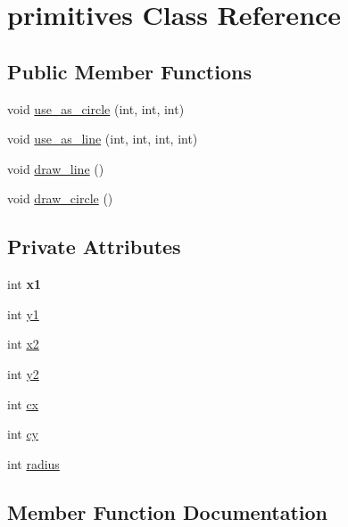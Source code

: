 \hypertarget{classprimitives}{}\section{primitives Class Reference}
\label{classprimitives}
\subsection*{Public Member Functions}
\begin{DoxyCompactItemize}
\item 
void \mbox{\hyperlink{classprimitives_a564d6b5f62f0958ed7773fdddd8ae05c}{use\+\_\+as\+\_\+circle}} (int, int, int)
\item 
void \mbox{\hyperlink{classprimitives_af30707ef8153f3770400b1b1126cae79}{use\+\_\+as\+\_\+line}} (int, int, int, int)
\item 
void \mbox{\hyperlink{classprimitives_a0884f9ffa84019993dbeed357fe853c6}{draw\+\_\+line}} ()
\item 
void \mbox{\hyperlink{classprimitives_ac0b53b1bb61a5c2a75a412f6ec032eb2}{draw\+\_\+circle}} ()
\end{DoxyCompactItemize}
\subsection*{Private Attributes}
\begin{DoxyCompactItemize}
\item 
\mbox{\label{classprimitives_a680eae67e6824f8078164ea6d992384b}} 
int {\bfseries x1}
\item 
int \mbox{\hyperlink{classprimitives_a98cbb319f4fe40b7987d2c7bdfd9fa6a}{y1}}
\item 
int \mbox{\hyperlink{classprimitives_ae3ac428b1195f1baf49fff4070c79280}{x2}}
\item 
int \mbox{\hyperlink{classprimitives_a77b49d02dc5171e8002222fe752c030e}{y2}}
\item 
int \mbox{\hyperlink{classprimitives_a46988726c6e4edf41a2c1d82d61565a5}{cx}}
\item 
int \mbox{\hyperlink{classprimitives_ab924e60ca6c29f90e0830719e3966d6a}{cy}}
\item 
int \mbox{\hyperlink{classprimitives_a0091dfd2f3dffce09b1e78884eeb8d79}{radius}}
\end{DoxyCompactItemize}


\subsection{Member Function Documentation}
\mbox{\label{classprimitives_ac0b53b1bb61a5c2a75a412f6ec032eb2}} 
